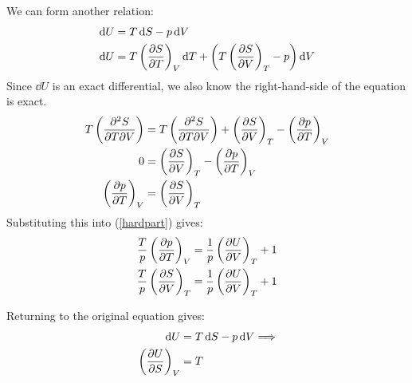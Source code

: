 \documentclass[10pt,\jkfside,a4paper]{article}
\begin{document}
\begin{enumerate}
\begin{enumerate}
We can form another relation:
\begin{equation}
\begin{split}
\dd{U} &= T\dd{S} - p\dd{V} \\
\dd{U} &= T\left(\pdv{S}{T}\right)_V\dd{T} + \left(T\left(\pdv{S}{V}\right)_T - p\right)\dd{V} \\
\end{split}
\end{equation}
Since $\dd{U}$ is an exact differential, we also know the right-hand-side of the equation is exact.
\begin{equation}
\begin{split}
T\left(\pdv[2]{S}{T}{V}\right) &= T\left(\pdv[2]{S}{T}{V}\right) + \left(\pdv{S}{V}\right)_T - \left(\pdv{p}{T}\right)_V \\
0 &= \left(\pdv{S}{V}\right)_T - \left(\pdv{p}{T}\right)_V \\
\left(\pdv{p}{T}\right)_V &= \left(\pdv{S}{V}\right)_T \\
\end{split}
\end{equation}
Substituting this into (\ref{hardpart}) gives:
\begin{equation}
\begin{split}
\frac{T}{p}\left(\pdv{p}{T}\right)_V &= \frac{1}{p}\left(\pdv{U}{V}\right)_T + 1 \\
\frac{T}{p}\left(\pdv{S}{V}\right)_T &= \frac{1}{p}\left(\pdv{U}{V}\right)_T + 1 \\
\end{split}
\end{equation}

Returning to the original equation gives:
\begin{equation}
\begin{split}
\dd{U} &= T\dd{S} - p\dd{V} \Longrightarrow \\
\left(\pdv{U}{S}\right)_V &= T \\
\end{split}
\end{equation}


\end{enumerate}
\end{enumerate}
\end{document}
